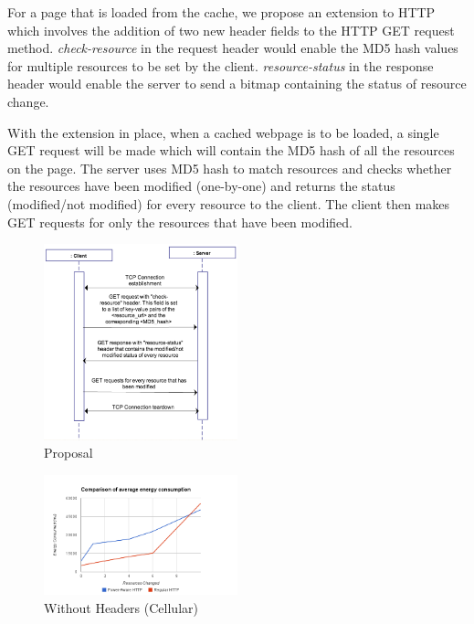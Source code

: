\documentclass[9pt]{sigplan-proc-varsize}
\begin{document}
For a page that is loaded from the cache, we propose an extension to HTTP which involves the addition of two new header fields to the HTTP GET request method. {\it check-resource} in the request header would enable the MD5 hash values for multiple resources to be set by the client. {\it resource-status} in the response header would enable the server to send a bitmap containing the status of resource change.

With the extension in place, when a cached webpage is to be loaded, a single GET request will be made which will contain the MD5 hash of all the resources on the page. The server uses MD5 hash to match resources and checks whether the resources have been modified (one-by-one) and returns the status (modified/not modified) for every resource to the client. The client then makes GET requests for only the resources that have been modified.

\begin{figure}
  \centering
  \includegraphics[width=0.5\textwidth]
    {proposal}%
  \caption{ Proposal  }
\end{figure}



\begin{figure}
  \centering
  \includegraphics[width=0.5\textwidth]
    {avg_energy.png}%
  \caption{ Without Headers (Cellular)  }
\end{figure}
\end{document}
